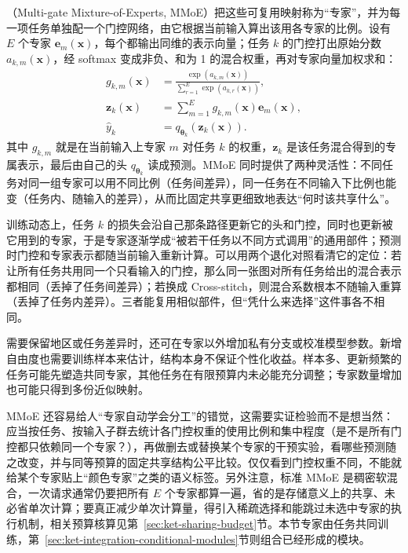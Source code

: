 （Multi-gate Mixture-of-Experts, MMoE）把这些可复用映射称为“专家”，并为每一项任务单独配一个门控网络，由它根据当前输入算出该用各专家的比例。设有 $E$ 个专家 $\bm e_m(\bm x)$，每个都输出同维的表示向量；任务 $k$ 的门控打出原始分数 $a_{k,m}(\bm x)$，经 softmax 变成非负、和为 1 的混合权重，再对专家向量加权求和：
\begin{align}
  g_{k,m}(\bm x)
    &=\frac{\exp(a_{k,m}(\bm x))}
      {\sum_{r=1}^{E}\exp(a_{k,r}(\bm x))},
  \\
  \bm z_k(\bm x)
    &=\sum_{m=1}^{E}g_{k,m}(\bm x)\bm e_m(\bm x),
  \nonumber\\
  \hat y_k&=q_{\bm{\theta}_k}(\bm z_k(\bm x)).
  \label{eq:ket-sharing-mmoe}
\end{align}
其中 $g_{k,m}$ 就是在当前输入上专家 $m$ 对任务 $k$ 的权重，$\bm z_k$ 是该任务混合得到的专属表示，最后由自己的头 $q_{\bm{\theta}_k}$ 读成预测。MMoE 同时提供了两种灵活性：不同任务对同一组专家可以用不同比例（任务间差异），同一任务在不同输入下比例也能变（任务内、随输入的差异），从而比固定共享更细致地表达“何时该共享什么”。

训练动态上，任务 $k$ 的损失会沿自己那条路径更新它的头和门控，同时也更新被它用到的专家，于是专家逐渐学成“被若干任务以不同方式调用”的通用部件；预测时门控和专家表示都随当前输入重新计算。可以用两个退化对照看清它的定位：若让所有任务共用同一个只看输入的门控，那么同一张图对所有任务给出的混合表示都相同（丢掉了任务间差异）；若换成 Cross-stitch，则混合系数根本不随输入重算（丢掉了任务内差异）。三者能复用相似部件，但“凭什么来选择”这件事各不相同。

需要保留地区或任务差异时，还可在专家以外增加私有分支或校准模型参数。新增自由度也需要训练样本来估计，结构本身不保证个性化收益。样本多、更新频繁的任务可能先塑造共同专家，其他任务在有限预算内未必能充分调整；专家数量增加也可能只得到多份近似映射。

MMoE 还容易给人“专家自动学会分工”的错觉，这需要实证检验而不是想当然：应当按任务、按输入子群去统计各门控权重的使用比例和集中程度（是不是所有门控都只依赖同一个专家？），再做删去或替换某个专家的干预实验，看哪些预测随之改变，并与同等预算的固定共享结构公平比较。仅仅看到门控权重不同，不能就给某个专家贴上“颜色专家”之类的语义标签。另外注意，标准 MMoE 是稠密软混合，一次请求通常仍要把所有 $E$ 个专家都算一遍，省的是存储意义上的共享、未必省单次计算；要真正减少单次计算量，得引入稀疏选择和能跳过未选中专家的执行机制，相关预算核算见第~\ref{sec:ket-sharing-budget}节。本节专家由任务共同训练，第~\ref{sec:ket-integration-conditional-modules}节则组合已经形成的模块。

